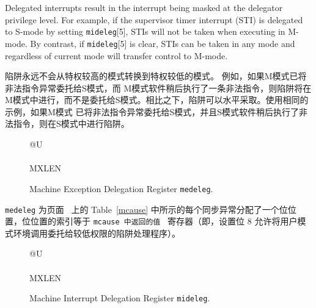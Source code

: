 Delegated interrupts result in the interrupt being masked at the delegator
privilege level.  For example, if the supervisor timer interrupt (STI) is
delegated to S-mode by setting {\tt mideleg}[5], STIs will not be taken when
executing in M-mode.  By contrast, if {\tt mideleg}[5] is clear, STIs can
be taken in any mode and regardless of current mode will transfer control to
M-mode.
\fi

陷阱永远不会从特权较高的模式转换到特权较低的模式。 例如，如果M模式已将非法指令异常委托给S模式，而 M模式软件稍后执行了一条非法指令，则陷阱将在M模式中进行，而不是委托给S模式。相比之下，陷阱可以水平采取。使用相同的示例，如果M模式 已将非法指令异常委托给S模式，并且S模式软件稍后执行了非法指令，则在S模式中进行陷阱。

\begin{figure}[h!]
{\footnotesize
\begin{center}
\begin{tabular}{@{}U}
 \\
\hline
{} \\
\hline
MXLEN \\
\end{tabular}
\end{center}
}
\vspace{-0.1in}
\caption{Machine Exception Delegation Register {\tt medeleg}.}
\label{medelegreg}
\end{figure}

\iffalse
{\tt medeleg} has a bit position allocated for every synchronous exception
shown in Table~\ref{mcauses} on page~\pageref{mcauses}, with the index of the bit position equal to the
value returned in the {\tt mcause} register (i.e., setting bit 8 allows
user-mode environment calls to be delegated to a lower-privilege trap
handler).
\fi

{\tt medeleg} 为页面~\pageref{mcause} 上的 Table~\ref{mcause} 中所示的每个同步异常分配了一个位位置，位位置的索引等于 {\tt mcause 中返回的值 } 寄存器（即，设置位 8 允许将用户模式环境调用委托给较低权限的陷阱处理程序）。

\begin{figure}[h!]
{\footnotesize
\begin{center}
\begin{tabular}{@{}U}
 \\
\hline
{} \\
\hline
MXLEN \\
\end{tabular}
\end{center}
}
\vspace{-0.1in}
\caption{Machine Interrupt Delegation Register {\tt mideleg}.}
\label{midelegreg}
\end{figure}

